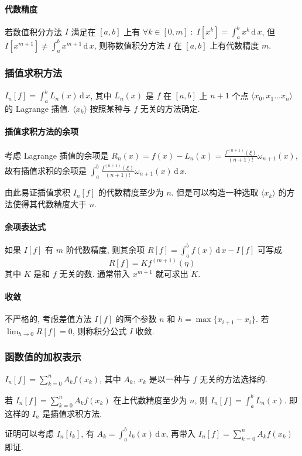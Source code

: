 \documentclass{ctexart}
\newcommand{\ud}{\,\mathrm{d}\,}
\begin{document}
\paragraph{代数精度}
    若数值积分方法 $I$ 满足在 $[a,b]$ 上有
    $\forall k \in [0, m]\;:\; I[x^k] = \int_a^b x^k \ud x$,
    但 $I[x^{m+1}] \neq \int_a^b x^{m+1} \ud x$,
    则称数值积分方法 $I$ 在 $[a,b]$ 上有代数精度 $m$.
\subsubsection{插值求积方法}
    $I_n[f] = \int_a^b L_n(x) \ud x$,
    其中 $L_n(x)$ 是 $f$ 在 $[a,b]$ 上 $n+1$ 个点
    $\langle x_0, x_1 \ldots x_n \rangle$ 的 Lagrange 插值.
    $\langle x_k \rangle$ 按照某种与 $f$ 无关的方法确定.
\paragraph{插值求积方法的余项}
    考虑 Lagrange 插值的余项是
    $R_n(x) = f(x) - L_n(x) =
        \frac{f^{(n+1)}(\xi)}{(n+1)!} \omega_{n+1}(x)$,
    故有插值求积的余项是
    $\int_a^b \frac{f^{(n+1)}(\xi)}{(n+1)!} \omega_{n+1}(x) \ud x$.\par
    由此易证插值求积 $I_n[f]$ 的代数精度至少为 $n$.
    但是可以构造一种选取 $\langle x_k \rangle$
    的方法使得其代数精度大于 $n$.
\paragraph{余项表达式}
    如果 $I[f]$ 有 $m$ 阶代数精度, 则其余项 $R[f] = \int_a^b f(x) \ud x - I[f]$
    可写成 \[
        R[f] = K f^{(m+1)}(\eta)\]
    其中 $K$ 是和 $f$ 无关的数. 通常带入 $x^{m+1}$ 就可求出 $K$.
\paragraph{收敛}
    不严格的, 考虑差值方法 $I[f]$ 的两个参数 $n$ 和 $h = \max\{x_{i+1} - x_i\}$.
    若 $\lim_{h\to 0} R[f] = 0$, 则称积分公式 $I$ 收敛.
\subsubsection{函数值的加权表示}
    $I_n[f] = \sum_{k = 0}^n A_k f(x_k)$,
    其中 $A_k$, $x_k$ 是以一种与 $f$ 无关的方法选择的.\par
    若 $I_n[f] = \sum_{k=0}^n A_k f(x_k)$ 在上代数精度至少为 $n$,
    则 $I_n[f] = \int_a^b L_n(x)$. 即这样的 $I_n$ 是插值求积方法.\par
    证明可以考虑 $I_n[l_k]$, 有 $A_k = \int_a^b l_k(x) \ud x$,
    再带入 $I_n[f] = \sum_{k=0}^n A_k f(x_k)$ 即证.
\end{document}
